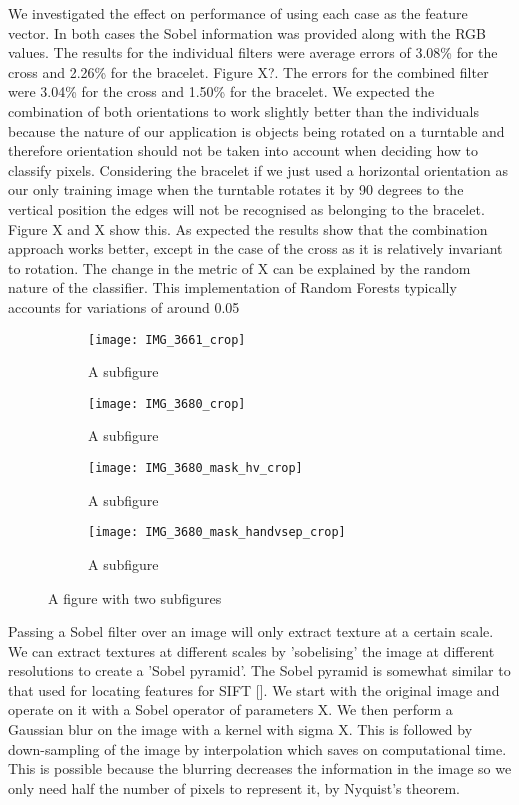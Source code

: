 \documentclass[12pt]{IIBproject}
\begin{document}
We investigated the effect on performance of using each case as the feature vector. In both cases the Sobel information was provided along with the RGB values. The results for the individual filters were average errors of 3.08\% for the cross and 2.26\% for the bracelet. Figure X?. The errors for the combined filter were 3.04\% for the cross and 1.50\% for the bracelet. We expected the combination of both orientations to work slightly better than the individuals because the nature of our application is objects being rotated on a turntable and therefore orientation should not be taken into account when deciding how to classify pixels. Considering the bracelet if we just used a horizontal orientation as our only training image when the turntable rotates it by 90 degrees to the vertical position the edges will not be recognised as belonging to the bracelet. Figure X and X show this. As expected the results show that the combination approach works better, except in the case of the cross as it is relatively invariant to rotation. The change in the metric of X can be explained by the random nature of the classifier. This implementation of Random Forests typically accounts for variations of around 0.05%
\begin{figure}[H]
\centering
\begin{subfigure}{.45\textwidth}
  \centering
  \texttt{[image: IMG\_3661\_crop]}
  \caption{A subfigure}
  \label{fig:sub2}
\end{subfigure}
\begin{subfigure}{.45\textwidth}
  \centering
  \texttt{[image: IMG\_3680\_crop]}
  \caption{A subfigure}
  \label{fig:sub2}
\end{subfigure}
\begin{subfigure}{.45\textwidth}
  \centering
  \texttt{[image: IMG\_3680\_mask\_hv\_crop]}
  \caption{A subfigure}
  \label{fig:sub1}
\end{subfigure}%
\begin{subfigure}{.45\textwidth}
  \centering
  \texttt{[image: IMG\_3680\_mask\_handvsep\_crop]}
  \caption{A subfigure}
  \label{fig:sub2}
\end{subfigure}

\caption{A figure with two subfigures}
\label{fig:test}
\end{figure}

Passing a Sobel filter over an image will only extract texture at a certain scale. We can extract textures at different scales by 'sobelising' the image at different resolutions to create a 'Sobel pyramid'. The Sobel pyramid is somewhat similar to that used for locating features for SIFT []. We start with the original image and operate on it with a Sobel operator of parameters X. We then perform a Gaussian blur on the image with a kernel with sigma X. This is followed by down-sampling of the image by interpolation which saves on computational time. This is possible because the blurring decreases the information in the image so we only need half the number of pixels to represent it, by Nyquist's theorem.
\end{document}
